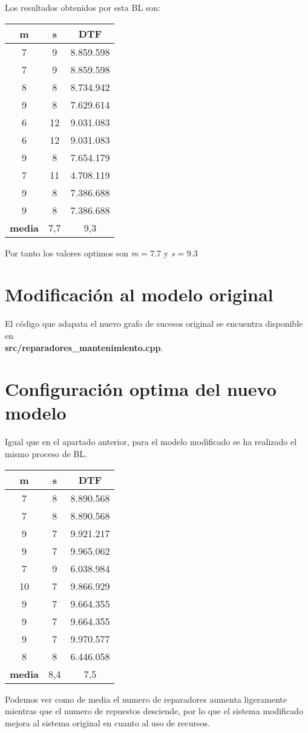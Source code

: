 Los resultados obtenidos por esta BL son:
\begin{table}[H]
\centering
\begin{tabular}{|ccc|}
\hline
\multicolumn{1}{|c|}{\textbf{m}} & \multicolumn{1}{c|}{\textbf{s}} & \textbf{DTF} \\ \hline
7 & 9 & 8.859.598 \\
7 & 9 & 8.859.598 \\
8 & 8 & 8.734.942 \\
9 & 8 & 7.629.614 \\
6 & 12 & 9.031.083 \\
6 & 12 & 9.031.083 \\
9 & 8 & 7.654.179 \\
7 & 11 & 4.708.119 \\
9 & 8 & 7.386.688 \\
9 & 8 & 7.386.688 \\ \hline
\multicolumn{1}{|c|}{\textbf{media}} & \multicolumn{1}{c|}{7,7} & 9,3 \\ \hline
\end{tabular}
\end{table}

Por tanto los valores optimos son \textit{m} = 7.7 y \textit{s} = 9.3

\section{Modificación al modelo original}
El código que adapata el nuevo grafo de sucesos original se encuentra disponible en \\ \textbf{src/reparadores\_mantenimiento.cpp}.

\section{Configuración optima del nuevo modelo}
Igual que en el apartado anterior, para el modelo modificado se ha realizado el mismo proceso de BL.

\begin{table}[H]
\centering
\begin{tabular}{|ccc|}
\hline
\multicolumn{1}{|c|}{\textbf{m}} & \multicolumn{1}{c|}{\textbf{s}} & \textbf{DTF} \\ \hline
7 & 8 & 8.890.568 \\
7 & 8 & 8.890.568 \\
9 & 7 & 9.921.217 \\
9 & 7 & 9.965.062 \\
7 & 9 & 6.038.984 \\
10 & 7 & 9.866.929 \\
9 & 7 & 9.664.355 \\
9 & 7 & 9.664.355 \\
9 & 7 & 9.970.577 \\
8 & 8 & 6.446.058 \\ \hline
\multicolumn{1}{|c|}{\textbf{media}} & \multicolumn{1}{c|}{8,4} & 7,5 \\ \hline
\end{tabular}
\end{table}

Podemos ver como de media el numero de reparadores aumenta ligeramente mientras que el numero de repuestos desciende, por lo que el sistema modificado mejora al sistema original en cuanto al uso de recursos.
